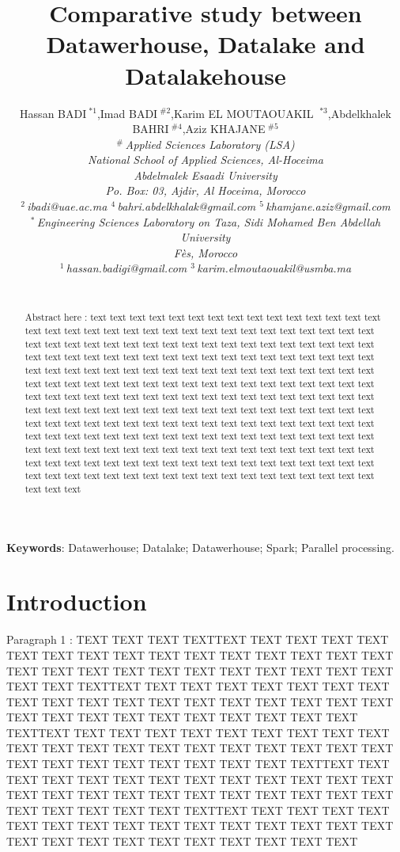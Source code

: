 \documentclass[10pt,conference,letterpaper]{IEEEtran}
\title{Comparative study between Datawerhouse, Datalake and Datalakehouse}
\author{%
{Hassan BADI{\small $~^{\ast1}$},Imad BADI{\small $~^{\#2}$},Karim EL MOUTAOUAKIL {\small $~^{\ast3}$},Abdelkhalek BAHRI{\small $~^{\#4}$},Aziz KHAJANE{\small $~^{\#5}$}}%
\vspace{1.6mm}\\
\fontsize{10}{10}\selectfont\itshape
$^{\#}$\,Applied Sciences Laboratory (LSA)\\
National School of Applied Sciences, Al-Hoceima\\
 Abdelmalek Esaadi University\\
Po. Box: 03, Ajdir, Al Hoceima, Morocco\\
\fontsize{9}{9}\selectfont\ttfamily\upshape
$^{2}$\,ibadi@uae.ac.ma
$^{4}$\,bahri.abdelkhalak@gmail.com 
$^{5}$\,khamjane.aziz@gmail.com  
\vspace{1.2mm}\\
\fontsize{10}{10}\selectfont\rmfamily\itshape
$^{*}$\,Engineering Sciences Laboratory on Taza, Sidi Mohamed Ben Abdellah University\\
Fès, Morocco\\
\fontsize{9}{9}\selectfont\ttfamily\upshape
$^{1}$\,hassan.badigi@gmail.com
$^{3}$\,karim.elmoutaouakil@usmba.ma

\vspace{1.2mm}\\
}
\begin{document}
\maketitle
%
\begin{abstract}
%
%

\par Abstract here : text text text text text  text text text text text text text text text text  text text text 
 text text text  text text text  text text text  text text text  text text text  text text text  text text text  
 text text text  text text text  text text text  text text text  text text text 
 text text text  text text text  text text text  text text text  text text text  text text text 
 text text text  text text text  text text text  text text text  text text text  text text text  text text text  
 text text text  text text text  text text text  text text text  text text text 
 text text text  text text text  text text text  text text text  text text text  text text text 
  text text text  text text text  text text text  text text text  text text text  text text text  text text text  
 text text text  text text text  text text text  text text text  text text text 
 text text text  text text text  text text text  text text text  text text text  text text text 
  text text text  text text text  text text text  text text text  text text text  text text text  text text text  
 text text text  text text text  text text text  text text text  text text text 
 text text text  text text text  text text text  text text text  text text text  text text text 

\end{abstract}

\par \textbf{Keywords}:
Datawerhouse; Datalake; Datawerhouse; Spark; Parallel processing.

\section{Introduction}
%
\par
Paragraph 1 :
TEXT TEXT TEXT TEXTTEXT TEXT TEXT TEXT  TEXT TEXT  TEXT TEXT  TEXT TEXT  TEXT TEXT  TEXT TEXT  TEXT TEXT  TEXT TEXT  TEXT TEXT  TEXT TEXT  TEXT TEXT  TEXT TEXT 
TEXT TEXT TEXT TEXTTEXT TEXT TEXT TEXT  TEXT TEXT  TEXT TEXT  TEXT TEXT  TEXT TEXT  TEXT TEXT  TEXT TEXT  TEXT TEXT  TEXT TEXT  TEXT TEXT  TEXT TEXT  TEXT TEXT 
TEXT TEXT TEXT TEXTTEXT TEXT TEXT TEXT  TEXT TEXT  TEXT TEXT  TEXT TEXT  TEXT TEXT  TEXT TEXT  TEXT TEXT  TEXT TEXT  TEXT TEXT  TEXT TEXT  TEXT TEXT  TEXT TEXT 
TEXT TEXT TEXT TEXTTEXT TEXT TEXT TEXT  TEXT TEXT  TEXT TEXT  TEXT TEXT  TEXT TEXT  TEXT TEXT  TEXT TEXT  TEXT TEXT  TEXT TEXT  TEXT TEXT  TEXT TEXT  TEXT TEXT 
TEXT TEXT TEXT TEXTTEXT TEXT TEXT TEXT  TEXT TEXT  TEXT TEXT  TEXT TEXT  TEXT TEXT  TEXT TEXT  TEXT TEXT  TEXT TEXT  TEXT TEXT  TEXT TEXT  TEXT TEXT  TEXT TEXT 
\end{document}
